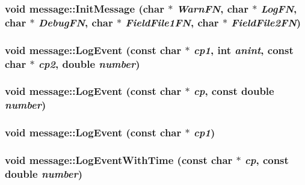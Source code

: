 \label{classmessage_a9c4d08163cff8ee8dba9eb8b6317a8b9}
\hypertarget{classmessage_ab54d58e7ae577d16bfae5b0f7d97cecb}{
\subsubsection[{InitMessage}]{\setlength{\rightskip}{0pt plus 5cm}void message::InitMessage (char $\ast$ {\em WarnFN}, \/  char $\ast$ {\em LogFN}, \/  char $\ast$ {\em DebugFN}, \/  char $\ast$ {\em FieldFile1FN}, \/  char $\ast$ {\em FieldFile2FN})}}
\label{classmessage_ab54d58e7ae577d16bfae5b0f7d97cecb}
\hypertarget{classmessage_a498bc2c5d2fb315b339f12ac47a702fb}{
\subsubsection[{LogEvent}]{\setlength{\rightskip}{0pt plus 5cm}void message::LogEvent (const char $\ast$ {\em cp1}, \/  int {\em anint}, \/  const char $\ast$ {\em cp2}, \/  double {\em number})}}
\label{classmessage_a498bc2c5d2fb315b339f12ac47a702fb}
\hypertarget{classmessage_ae578234ff0b329aa475c379a15aa2777}{
\subsubsection[{LogEvent}]{\setlength{\rightskip}{0pt plus 5cm}void message::LogEvent (const char $\ast$ {\em cp}, \/  const double {\em number})}}
\label{classmessage_ae578234ff0b329aa475c379a15aa2777}
\hypertarget{classmessage_acd59708da958867b53d2fc740f5607fb}{
\subsubsection[{LogEvent}]{\setlength{\rightskip}{0pt plus 5cm}void message::LogEvent (const char $\ast$ {\em cp1})}}
\label{classmessage_acd59708da958867b53d2fc740f5607fb}
\hypertarget{classmessage_a5e553d7905bef50a91b8318445139033}{
\subsubsection[{LogEventWithTime}]{\setlength{\rightskip}{0pt plus 5cm}void message::LogEventWithTime (const char $\ast$ {\em cp}, \/  const double {\em number})}}
